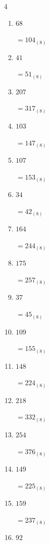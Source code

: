 \begin{multicols}{4}
\begin{enumerate}
        $=321_{(8)}$

  \item $68$

        $=104_{(8)}$

\columnbreak %

\resetques

  \item $41$

        $=51_{(8)}$

  \item $207$

        $=317_{(8)}$

  \item $103$

        $=147_{(8)}$

  \item $107$

        $=153_{(8)}$

  \item $34$

        $=42_{(8)}$

  \item $164$

        $=244_{(8)}$

  \item $175$

        $=257_{(8)}$

  \item $37$

        $=45_{(8)}$

  \item $109$

        $=155_{(8)}$

  \item $148$

        $=224_{(8)}$

  \item $218$

        $=332_{(8)}$

  \item $254$

        $=376_{(8)}$

  \item $149$

        $=225_{(8)}$

  \item $159$

        $=237_{(8)}$

  \item $92$


\end{enumerate}
\end{multicols}
